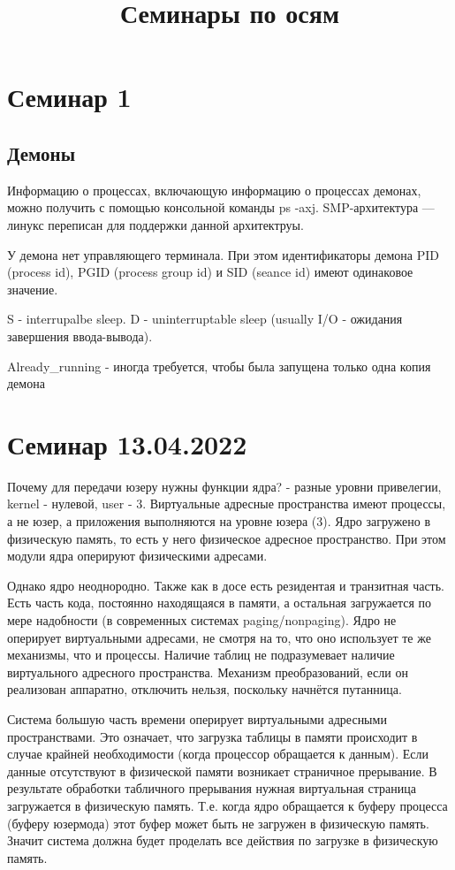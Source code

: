 \title{Семинары по осям}
\chapter{Семинар 1}
\section{Демоны}
Информацию о процессах, включающую информацию о процессах демонах, можно получить с помощью консольной команды ps -axj. SMP-архитектура --- линукс переписан для поддержки данной архитектруы. 

У демона нет управляющего терминала. При этом идентификаторы демона PID (process id), PGID (process group id) и SID (seance id) имеют одинаковое значение. 

S - interrupalbe sleep. D - uninterruptable sleep (usually I/O - ожидания завершения ввода-вывода).

Already\_running - иногда требуется, чтобы была запущена только одна копия демона 

\chapter{Семинар 13.04.2022}
Почему для передачи юзеру нужны функции ядра? - разные уровни привелегии, kernel - нулевой, user - 3. Виртуальные адресные пространства имеют процессы, а не юзер, а приложения выполняются на уровне юзера (3). Ядро загружено в физическую память, то есть у него физическое адресное пространство. При этом модули ядра оперируют физическими адресами.

Однако ядро неоднородно. Также как в досе есть резидентая и транзитная часть. Есть часть кода, постоянно находящаяся в памяти, а остальная загружается по мере надобности (в современных системах paging/nonpaging). Ядро не оперирует виртуальными адресами, не смотря на то, что оно использует те же механизмы, что и процессы. Наличие таблиц не подразумевает наличие виртуального адресного пространства. Механизм преобразований, если он реализован аппаратно, отключить нельзя, поскольку начнётся путанница. 

Система большую часть времени оперирует виртуальными адресными пространствами. Это означает, что загрузка таблицы в памяти происходит в случае крайней необходимости (когда процессор обращается к данным). Если данные отсутствуют в физической памяти возникает страничное прерывание. В результате обработки табличного прерывания нужная виртуальная страница загружается в физическую память. Т.е. когда ядро обращается к буферу процесса (буферу юзермода) этот буфер может быть не загружен в физическую память. Значит система должна будет проделать все действия по загрузке в физическую память. 

